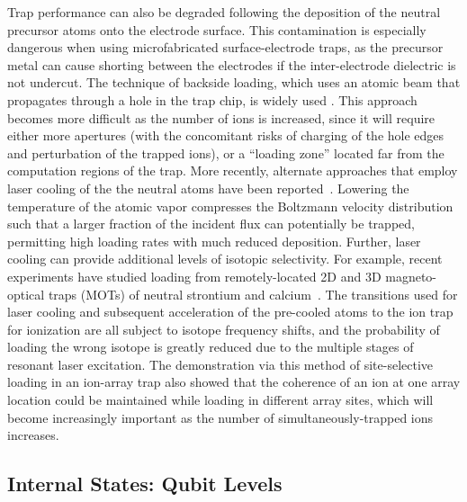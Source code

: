 \documentclass[%
reprint,
 amsmath,amssymb,
]{revtex4-1}
\begin{document}
Trap performance can also be degraded following the deposition of the neutral precursor atoms onto the electrode surface. This contamination is especially dangerous when using microfabricated surface-electrode traps, as the precursor metal can cause shorting between the electrodes if the inter-electrode dielectric is not undercut. The technique of backside loading, which uses an atomic beam that propagates through a hole in the trap chip, is widely used \cite{NIST:Bksideloading:APL:09,stick2010demonstration,merrill2011demonstration}. This approach becomes more difficult as the number of ions is increased, since it will require either more apertures (with the concomitant risks of charging of the hole edges and perturbation of the trapped ions), or a ``loading zone'' located far from the computation regions of the trap. More recently, alternate approaches that employ laser cooling of the the neutral atoms have been reported~\cite{cetina2007bright,sage2012loading,BruzewiczArrayLoading2016}. Lowering the temperature of the atomic vapor compresses the Boltzmann velocity distribution such that a larger fraction of the incident flux can potentially be trapped, permitting high loading rates with much reduced deposition. Further, laser cooling can provide additional levels of isotopic selectivity. For example, recent experiments have studied loading from remotely-located 2D and 3D magneto-optical traps (MOTs) of neutral strontium and calcium~\cite{sage2012loading,BruzewiczArrayLoading2016,BruzewiczQLAR2017}. The transitions used for laser cooling and subsequent acceleration of the pre-cooled atoms to the ion trap for ionization are all subject to isotope frequency shifts, and the probability of loading the wrong isotope is greatly reduced due to the multiple stages of resonant laser excitation. The demonstration via this method of site-selective loading in an ion-array trap \cite{BruzewiczArrayLoading2016} also showed that the coherence of an ion at one array location could be maintained while loading in different array sites, which will become increasingly important as the number of simultaneously-trapped ions increases.

\subsection{Internal States:  Qubit Levels}
\label{subInternal}
\end{document}
